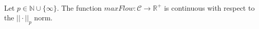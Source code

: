 \begin{theorem} \ \\
   \label{maxflowcont}
   Let $p \in \mathbb{N} \cup \{\infty\}$. The function $maxFlow : \mathcal{C} \rightarrow \mathbb{R}^{+}$ is continuous with
   respect to the $||\cdot||_p$ norm.
\end{theorem}
